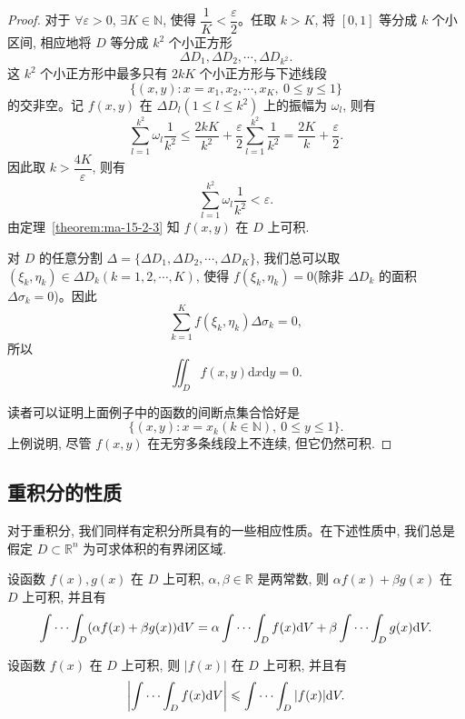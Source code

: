 \begin{proof}
对于 $\forall\varepsilon>0$, $\exists K\in\mathbb N$, 使得 $\dfrac1K<\dfrac{\varepsilon}{2}$。任取 $k>K$, 将 $[0,1]$ 等分成 $k$ 个小区间, 相应地将 $D$ 等分成 $k^2$ 个小正方形
\[
  \Delta D_1,\Delta D_2,\cdots,\Delta D_{k^2}.
\]
这 $k^2$ 个小正方形中最多只有 $2kK$ 个小正方形与下述线段
\[
  \{(x,y):x=x_1,x_2,\cdots,x_K,\ 0\leqslant y\leqslant1\}
\]
的交非空。记 $f(x,y)$ 在 $\Delta D_l(1\leqslant l\leqslant k^2)$ 上的振幅为 $\omega_l$, 则有
\[
  \sum_{l=1}^{k^2}\omega_l\frac1{k^2}
  \leqslant \frac{2kK}{k^2}+\frac{\varepsilon}{2}\sum_{l=1}^{k^2}\frac1{k^2}
  =\frac{2K}{k}+\frac{\varepsilon}{2}.
\]
因此取 $k>\dfrac{4K}{\varepsilon}$, 则有
\[
  \sum_{l=1}^{k^2}\omega_l\frac1{k^2}<\varepsilon.
\]
由定理~\ref{theorem:ma-15-2-3} 知 $f(x,y)$ 在 $D$ 上可积.

对 $D$ 的任意分割 $\Delta=\{\Delta D_1,\Delta D_2,\cdots,\Delta D_K\}$, 我们总可以取 $(\xi_k,\eta_k)\in\Delta D_k(k=1,2,\cdots,K)$, 使得 $f(\xi_k,\eta_k)=0$(除非 $\Delta D_k$ 的面积 $\Delta\sigma_k=0$)。因此
\[
  \sum_{k=1}^K f(\xi_k,\eta_k)\Delta\sigma_k=0,
\]
所以
\[
  \iint_D f(x,y)\mathrm dx\mathrm dy=0.
\]

读者可以证明上面例子中的函数的间断点集合恰好是
\[
  \{(x,y):x=x_k(k\in\mathbb N),\ 0\leqslant y\leqslant1\}.
\]
上例说明, 尽管 $f(x,y)$ 在无穷多条线段上不连续, 但它仍然可积.
\end{proof}


\subsection{重积分的性质}
\label{subsec:ma-15-2-2}

对于重积分, 我们同样有定积分所具有的一些相应性质。在下述性质中, 我们总是假定 $D\subset\mathbb R^n$ 为可求体积的有界闭区域.

\begin{property}\label{property:ma-15-2-5}
设函数 $f(x),g(x)$ 在 $D$ 上可积, $\alpha,\beta\in\mathbb R$ 是两常数, 则 $\alpha f(x)+\beta g(x)$ 在 $D$ 上可积, 并且有
\[
  \idotsint_D(\alpha f(x)+\beta g(x))\mathrm dV
  =\alpha\idotsint_D f(x)\mathrm dV+\beta\idotsint_D g(x)\mathrm dV.
\]
\end{property}


\begin{property}\label{property:ma-15-2-6}
设函数 $f(x)$ 在 $D$ 上可积, 则 $|f(x)|$ 在 $D$ 上可积, 并且有
\[
  \left|\idotsint_D f(x)\mathrm dV\right|
  \leqslant \idotsint_D |f(x)|\mathrm dV.
\]
\end{property}


